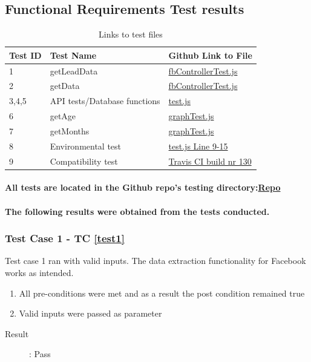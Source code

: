 \documentclass{article}
\begin{document}
\subsection{Functional Requirements Test results}
\begin{table}[H]
\centering
\label{link_table}
\begin{tabular}{|l|l|l|}
\hline
Test ID    & Test Name   & Github Link to File \\ \hline \hline
1          & getLeadData &  \href{https://github.com/QuintonWeenink/ValknutSolutions/blob/develop/test/fbControllerTest.js}{fbControllerTest.js}         \\ \hline
2          & getData  &  \href{https://github.com/QuintonWeenink/ValknutSolutions/blob/develop/test/fbControllerTest.js}{fbControllerTest.js}       \\ \hline
3,4,5      & API tests/Database functions & \href{https://github.com/QuintonWeenink/ValknutSolutions/blob/develop/test/test.js}{test.js}         \\ \hline
6          & getAge    & \href{https://github.com/QuintonWeenink/ValknutSolutions/blob/develop/test/graphTest.js}{graphTest.js} \\ \hline
7          & getMonths  & \href{https://github.com/QuintonWeenink/ValknutSolutions/blob/develop/test/graphTest.js}{graphTest.js} \\ \hline 
8          &  Environmental test  & \href{https://github.com/QuintonWeenink/ValknutSolutions/blob/develop/test/test.js}{test.js Line 9-15}\\ \hline
9		   & Compatibility test & \href{https://travis-ci.com/QuintonWeenink/ValknutSolutions/builds/30866212}{Travis CI build nr 130} \\ \hline
\end{tabular}
\caption{Links to test files}
\end{table}
\paragraph{All tests are located in the Github repo's testing directory:\href{https://github.com/QuintonWeenink/ValknutSolutions}{Repo}}

\paragraph{The following results were obtained from the tests conducted.}
\subsubsection{Test Case 1 - TC \ref{test1}}
Test case 1 ran with valid inputs.
The data extraction functionality for Facebook works as intended.
\begin{enumerate}
	\item All pre-conditions were met and as a result the post condition remained true
	\item Valid inputs were passed as parameter 
\end{enumerate}
\begin{description}
	\item [Result]: Pass 
\end{description}
\end{document}

